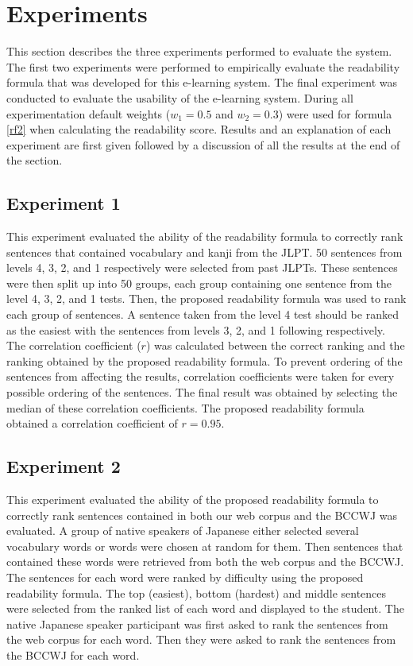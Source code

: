 \documentclass[english]{jnlp_1.4}
\begin{document}
\section{Experiments}

This section describes the three experiments performed to evaluate the system. The first two experiments were performed to empirically evaluate the readability formula that was developed for this e-learning system. The final experiment was conducted to evaluate the usability of the e-learning system. During all experimentation default weights ($w_1 = 0.5$ and $w_2 = 0.3$) were used for formula \ref{rf2} when calculating the readability score. Results and an explanation of each experiment are first given followed by a discussion of all the results at the end of the section.


\subsection{Experiment 1}

This experiment evaluated the ability of the readability formula to correctly rank sentences that contained vocabulary and kanji from the JLPT. 50 sentences from levels 4, 3, 2, and 1 respectively were selected from past JLPTs. These sentences were then split up into 50 groups, each group containing one sentence from the level 4, 3, 2, and 1 tests. Then, the proposed readability formula was used to rank each group of sentences. A sentence taken from the level 4 test should be ranked as the easiest with the sentences from levels 3, 2, and 1 following respectively. The correlation coefficient ($r$) was calculated between the correct ranking and the ranking obtained by the proposed readability formula. To prevent ordering of the sentences from affecting the results, correlation coefficients were taken for every possible ordering of the sentences. The final result was obtained by selecting the median of these correlation coefficients. The proposed readability formula obtained a correlation coefficient of $r = 0.95$.


\subsection{Experiment 2}

This experiment evaluated the ability of the proposed readability formula to correctly rank sentences contained in both our web corpus and the BCCWJ was evaluated. A group of native speakers of Japanese either selected several vocabulary words or words were chosen at random for them. Then sentences that contained these words were retrieved from both the web corpus and the BCCWJ. The sentences for each word were ranked by difficulty using the proposed readability formula. The top (easiest), bottom (hardest) and middle sentences were selected from the ranked list of each word and displayed to the student. The native Japanese speaker participant was first asked to rank the sentences from the web corpus for each word. Then they were asked to rank the sentences from the BCCWJ for each word.
\end{document}
